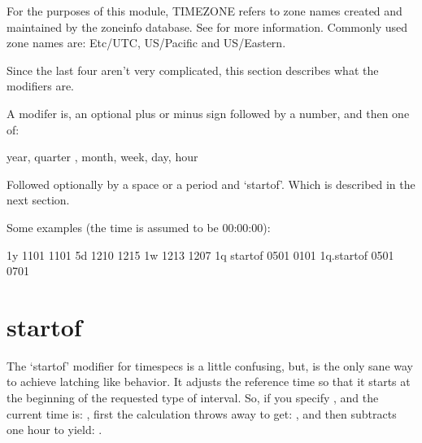 \documentclass[letterpaper,10pt,english]{sphinxmanual}
\begin{document}
For the purposes of this module, TIMEZONE refers to zone names
created and maintained by the zoneinfo database.
See  for more information.
Commonly used zone names are: Etc/UTC, US/Pacific and US/Eastern.

Since the last four aren’t very complicated, this section describes
what the modifiers are.

A modifer is, an optional plus or minus sign followed by a number,
and then one of:

\begin{sphinxVerbatim}[commandchars=\\\{\}]
  year,   quarter ,   month,   week,   day,   hour
\end{sphinxVerbatim}

Followed optionally by a space or a period and ‘startof’.
Which is described in the next section.

Some examples (the time is assumed to be 00:00:00):

\begin{sphinxVerbatim}[commandchars=\\\{\}]
\PYGZhy{}1y         \PYGZhy{}11\PYGZhy{}01 \PYGZhy{}\PYGZgt{} \PYGZhy{}11\PYGZhy{}01
 5d         \PYGZhy{}12\PYGZhy{}10 \PYGZhy{}\PYGZgt{} \PYGZhy{}12\PYGZhy{}15
\PYGZhy{}1w         \PYGZhy{}12\PYGZhy{}13 \PYGZhy{}\PYGZgt{} \PYGZhy{}12\PYGZhy{}07
\PYGZhy{}1q startof \PYGZhy{}05\PYGZhy{}01 \PYGZhy{}\PYGZgt{} \PYGZhy{}01\PYGZhy{}01
 1q.startof \PYGZhy{}05\PYGZhy{}01 \PYGZhy{}\PYGZgt{} \PYGZhy{}07\PYGZhy{}01
\end{sphinxVerbatim}


\section{startof}
\label{\detokenize{mariadb-parted:startof}}
The ‘startof’ modifier for timespecs is a little confusing,
but, is the only sane way to achieve latching like behavior.
It adjusts the reference time so that it starts at the beginning
of the requested type of interval. So, if you specify ,
and the current time is: , first the calculation
throws away  to get: , and then subtracts
one hour to yield: .
\end{document}
